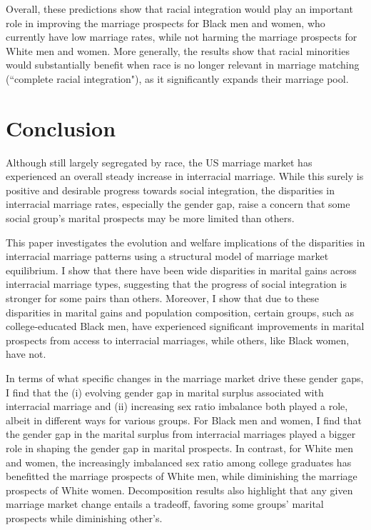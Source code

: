 Overall, these predictions show that racial integration would play an important role in improving the marriage prospects for Black men and women, who currently have low marriage rates, while not harming the marriage prospects for White men and women. More generally, the results show that racial minorities would substantially benefit when race is no longer relevant in marriage matching (``complete racial integration"), as it significantly expands their marriage pool. 






\section{Conclusion}  \label{sec:conclusion}

Although still largely segregated by race, the US marriage market has experienced an overall steady increase in interracial marriage. While this surely is positive and desirable progress towards social integration, the disparities in interracial marriage rates, especially the gender gap, raise a concern that some social group's marital prospects may be more limited than others. 

This paper investigates the evolution and welfare implications of the disparities in interracial marriage patterns using a structural model of marriage market equilibrium. I show that there have been wide disparities in marital gains across interracial marriage types, suggesting that the progress of social integration is stronger for some pairs than others. Moreover, I show that due to these disparities in marital gains and population composition, certain groups, such as college-educated Black men, have experienced significant improvements in marital prospects from access to interracial marriages, while others, like Black women, have not.

In terms of what specific changes in the marriage market drive these gender gaps, I find that the (i) evolving gender gap in marital surplus associated with interracial marriage and (ii) increasing sex ratio imbalance both played a role, albeit in different ways for various groups. For Black men and women, I find that the gender gap in the marital surplus from interracial marriages played a bigger role in shaping the gender gap in marital prospects. In contrast, for White men and women, the increasingly imbalanced sex ratio among college graduates has benefitted the marriage prospects of White men, while diminishing the marriage prospects of White women. Decomposition results also highlight that any given marriage market change entails a tradeoff, favoring some groups' marital prospects while diminishing other's. 


